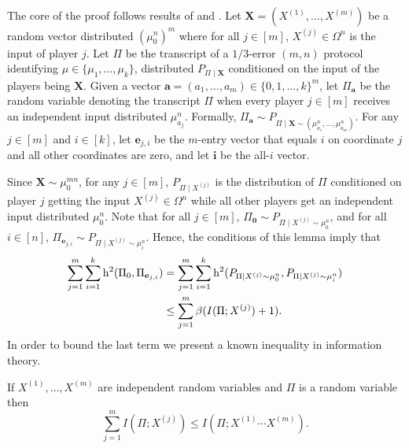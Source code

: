 
The core of the proof follows results of \cite{braverman2016communication} and \cite{jayram2009hellinger}. Let $\mathbf{X}=\left(X^{(1)}, \dots, X^{(m)}\right)$ be a random vector distributed $\left(\mu_0^n\right)^m$ where for all $j \in [m]$, $X^{(j)} \in \Omega^n$ is the input of player $j$. Let $\Pi$ be the transcript of a $1/3$-error $(m,n)$ protocol identifying $\mu \in \{\mu_1,\dots,\mu_k\}$, distributed $P_{\Pi \mid \mathbf{X}}$ conditioned on the input of the players being $\mathbf{X}$. Given a vector $\mathbf{a} = (a_1, \dots, a_m) \in \{0,1, \dots, k\}^m$, let $\Pi_{\mathbf{a}}$ be the random variable denoting the transcript $\Pi$ when every player $j \in [m]$ receives an independent input distributed $\mu_{a_j}^n$. Formally, $\Pi_{\mathbf{a}} \sim P_{\Pi \mid \mathbf{X} \sim \left( \mu_{a_1}^n, \dots, \mu_{a_m}^n \right)}$. For any $j\in [m]$ and $i \in [k]$, let $\mathbf{e}_{j,i}$ be the $m$-entry vector that equals $i$ on coordinate $j$ and all other coordinates are zero, and let $\mathbf{i}$ be the all-$i$ vector.

Since $\mathbf{X}\sim \mu_0^{mn}$, for any $j \in [m]$, $P_{\Pi \mid X^{(j)}}$ is the distribution of $\Pi$ conditioned on player $j$ getting the input $X^{(j)} \in \Omega^n$ while all other players get an independent input distributed $\mu_0^n$. Note that for all $j \in [m]$, $\Pi_{\mathbf{0}} \sim P_{\Pi \mid X^{(j)} \sim \mu_0^n}$, and for all $i \in [n]$, $\Pi_{\mathbf{e}_{j,i}} \sim P_{\Pi \mid X^{(j)} \sim \mu_i^n}$. Hence, the conditions of this lemma imply that
\begin{align}
\sum_{j=1}^m \sum_{i=1}^k \mathrm{h}^2(\Pi_0, \Pi_{\mathbf{e}_{j,i}})
&= \sum_{j=1}^m \sum_{i=1}^k \mathrm{h}^2(P_{\Pi \mid X^{(j)} \sim \mu_0^n}, P_{\Pi \mid X^{(j)} \sim \mu_i^n})\notag\\
&\le \sum_{j=1}^m \beta (I(\Pi ; X^{(j)}) + 1). \label{eq:bndeji}
\end{align}
In order to bound the last term we present a known inequality in information theory.
\begin{proposition}
If $X^{(1)}, \dots,X^{(m)}$ are independent random variables and $\Pi$ is a random variable then
\[
\sum_{j=1}^m I\left(\Pi; X^{(j)}\right)
\le I\left(\Pi; X^{(1)} \cdots X^{(m)}\right).
\]
\end{proposition}

